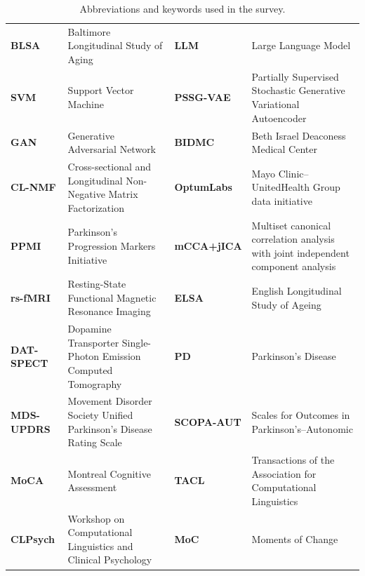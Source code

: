 \documentclass[11pt]{article}
\theoremstyle{plain}
\theoremstyle{definition}
\theoremstyle{remark}
\begin{document}
\begin{table}[!t]
\begin{tabularx}{\textwidth}{@{}>{\bfseries}p{1.9cm}X!{\vrule width 0.35pt}>{\bfseries}p{1.9cm}X@{}}
BLSA & Baltimore Longitudinal Study of Aging & LLM & Large Language Model \\
SVM & Support Vector Machine & PSSG-VAE & Partially Supervised Stochastic Generative Variational Autoencoder \\
GAN & Generative Adversarial Network & BIDMC & Beth Israel Deaconess Medical Center \\
CL-NMF & Cross-sectional and Longitudinal Non-Negative Matrix Factorization & OptumLabs & Mayo Clinic--UnitedHealth Group data initiative \\
PPMI & Parkinson's Progression Markers Initiative & mCCA+jICA & Multiset canonical correlation analysis with joint independent component analysis \\
rs-fMRI & Resting-State Functional Magnetic Resonance Imaging & ELSA & English Longitudinal Study of Ageing \\
DAT-SPECT & Dopamine Transporter Single-Photon Emission Computed Tomography & PD & Parkinson's Disease \\
MDS-UPDRS & Movement Disorder Society Unified Parkinson's Disease Rating Scale & SCOPA-AUT & Scales for Outcomes in Parkinson's--Autonomic \\
MoCA & Montreal Cognitive Assessment & TACL & Transactions of the Association for Computational Linguistics \\
CLPsych & Workshop on Computational Linguistics and Clinical Psychology & MoC & Moments of Change \\
\bottomrule
\end{tabularx}
\caption{Abbreviations and keywords used in the survey.}
\label{tab:abbreviations_keywords}
\end{table}
\end{document}
